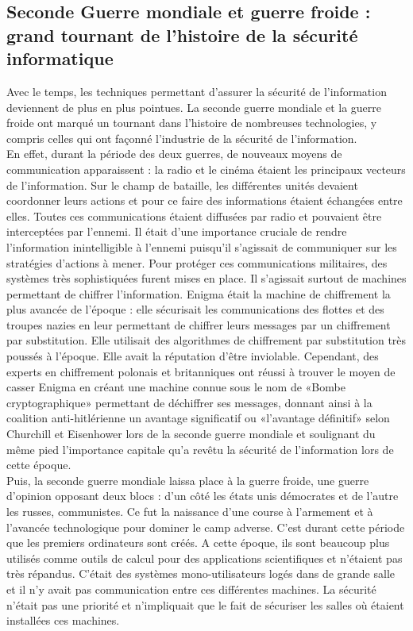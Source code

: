 \subsection{Seconde Guerre mondiale et guerre froide : grand tournant de l'histoire de la sécurité informatique}
Avec le temps, les techniques permettant d’assurer la sécurité de l’information deviennent de plus en plus pointues. La seconde guerre mondiale et la guerre froide ont marqué un tournant dans l’histoire de nombreuses technologies, y compris celles qui ont façonné l’industrie de la sécurité de l’information. \\
En effet, durant la période des deux guerres, de nouveaux moyens de communication apparaissent : la radio et le cinéma étaient les principaux vecteurs de l’information. Sur le champ de bataille, les différentes unités devaient coordonner leurs actions et pour ce faire des informations étaient échangées entre elles. Toutes ces communications étaient diffusées par radio et pouvaient être interceptées par l’ennemi. Il était d’une importance cruciale de rendre l’information inintelligible à l’ennemi puisqu’il s’agissait de communiquer sur les stratégies d’actions à mener. Pour protéger ces communications militaires, des systèmes très sophistiquées furent mises en place. Il s’agissait surtout de machines permettant de chiffrer l’information. Enigma était la machine de chiffrement la plus avancée de l’époque : elle sécurisait  les communications des flottes et des troupes nazies en leur permettant de chiffrer leurs messages par un chiffrement par substitution. Elle utilisait des algorithmes de chiffrement par substitution très poussés à l’époque. Elle avait la réputation d'être inviolable. Cependant, des experts en chiffrement polonais et britanniques ont réussi à trouver le moyen de casser Enigma en créant une machine connue sous le nom de «Bombe cryptographique» permettant de déchiffrer ses messages, donnant ainsi à la coalition anti-hitlérienne un avantage significatif  ou «l’avantage définitif» selon Churchill et Eisenhower  lors de la seconde guerre mondiale et soulignant du même pied l’importance capitale qu’a revêtu la sécurité de l’information lors de cette époque. \cite{checkmarx-history} \\ 
Puis, la seconde guerre mondiale laissa place à la guerre froide, une guerre d’opinion opposant deux blocs : d’un côté les états unis démocrates et de l’autre les russes, communistes. Ce fut la naissance d’une course à l’armement et à l’avancée technologique pour dominer le camp adverse. 
C’est durant cette période que les premiers ordinateurs sont créés. A cette époque, ils sont beaucoup plus utilisés comme outils de calcul pour des applications scientifiques et n’étaient pas très répandus. C’était des systèmes mono-utilisateurs logés dans de grande salle et il n’y avait pas communication entre ces différentes machines. La sécurité n’était pas une priorité et n’impliquait que le fait de sécuriser les salles où étaient installées ces machines. 
